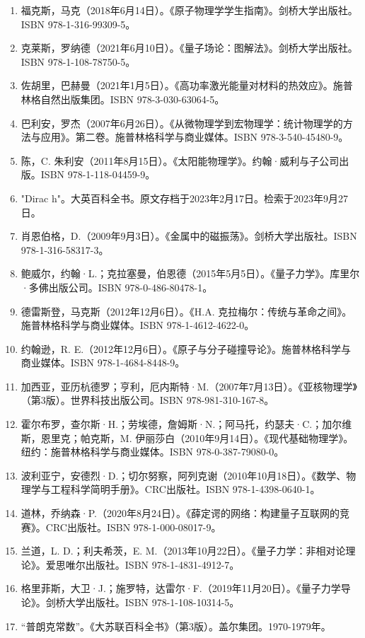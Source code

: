 \begin{enumerate}
\item 福克斯，马克（2018年6月14日）。《原子物理学学生指南》。剑桥大学出版社。ISBN 978-1-316-99309-5。  
\item 克莱斯，罗纳德（2021年6月10日）。《量子场论：图解法》。剑桥大学出版社。ISBN 978-1-108-78750-5。
\item 佐胡里，巴赫曼（2021年1月5日）。《高功率激光能量对材料的热效应》。施普林格自然出版集团。ISBN 978-3-030-63064-5。  
\item 巴利安，罗杰（2007年6月26日）。《从微物理学到宏物理学：统计物理学的方法与应用》。第二卷。施普林格科学与商业媒体。ISBN 978-3-540-45480-9。  
\item 陈，C. 朱利安（2011年8月15日）。《太阳能物理学》。约翰·威利与子公司出版。ISBN 978-1-118-04459-9。  
\item "Dirac h"。大英百科全书。原文存档于2023年2月17日。检索于2023年9月27日。
\item 肖恩伯格，D.（2009年9月3日）。《金属中的磁振荡》。剑桥大学出版社。ISBN 978-1-316-58317-3。  
\item 鲍威尔，约翰·L.；克拉塞曼，伯恩德（2015年5月5日）。《量子力学》。库里尔·多佛出版公司。ISBN 978-0-486-80478-1。
\item 德雷斯登，马克斯（2012年12月6日）。《H.A. 克拉梅尔：传统与革命之间》。施普林格科学与商业媒体。ISBN 978-1-4612-4622-0。  
\item 约翰逊，R. E.（2012年12月6日）。《原子与分子碰撞导论》。施普林格科学与商业媒体。ISBN 978-1-4684-8448-9。  
\item 加西亚，亚历杭德罗；亨利，厄内斯特·M.（2007年7月13日）。《亚核物理学》（第3版）。世界科技出版公司。ISBN 978-981-310-167-8。
\item 霍尔布罗，查尔斯·H.；劳埃德，詹姆斯·N.；阿马托，约瑟夫·C.；加尔维斯，恩里克；帕克斯，M. 伊丽莎白（2010年9月14日）。《现代基础物理学》。纽约：施普林格科学与商业媒体。ISBN 978-0-387-79080-0。  
\item 波利亚宁，安德烈·D.；切尔努察，阿列克谢（2010年10月18日）。《数学、物理学与工程科学简明手册》。CRC出版社。ISBN 978-1-4398-0640-1。  
\item 道林，乔纳森·P.（2020年8月24日）。《薛定谔的网络：构建量子互联网的竞赛》。CRC出版社。ISBN 978-1-000-08017-9。
\item 兰道，L. D.；利夫希茨，E. M.（2013年10月22日）。《量子力学：非相对论理论》。爱思唯尔出版社。ISBN 978-1-4831-4912-7。  
\item 格里菲斯，大卫·J.；施罗特，达雷尔·F.（2019年11月20日）。《量子力学导论》。剑桥大学出版社。ISBN 978-1-108-10314-5。  
\item “普朗克常数”。《大苏联百科全书》（第3版）。盖尔集团。1970-1979年。

\end{enumerate}
